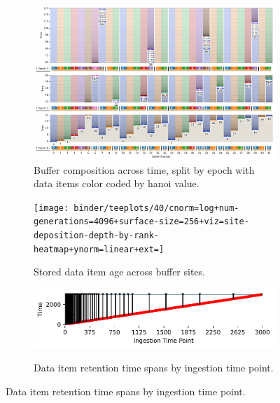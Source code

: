 \begin{figure}[h!]
  \centering

\begin{subfigure}[b]{\linewidth}
\includegraphics[width=\linewidth]{
binder/teeplots/40/num-generations=128+surface-size=32+viz=site-reservation-by-rank-spliced-at-heatmap+ext=}
\caption{
  Buffer composition across time, split by epoch with data items color coded by hanoi value.
}
\end{subfigure}

 \begin{minipage}[]{\textwidth}
 \vspace{-2pt}
  \begin{subfigure}[t]{0.7\linewidth}
    \vspace{0pt}
    \centering
  \texttt{[image: binder/teeplots/40/cnorm=log+num-generations=4096+surface-size=256+viz=site-deposition-depth-by-rank-heatmap+ynorm=linear+ext=]}
  \end{subfigure}%
  \begin{subfigure}[t]{0.3\linewidth}
  \vspace{-2pt}
  \caption{%
    Stored data item age across buffer sites.
  }
\end{subfigure}
\end{minipage}

   \begin{minipage}[]{\textwidth}
   \vspace{-2pt}
  \begin{subfigure}[t]{0.7\linewidth}
  \vspace{0pt}
    \centering
    \includegraphics[width=0.88\linewidth,clip]{binder/teeplots/40/num-generations=4096+surface-size=64+viz=stratum-persistence-dripplot+ext=}
  \end{subfigure}%
  \begin{subfigure}[t]{0.3\linewidth}
  \vspace{-2pt}
  \caption{%
    Data item retention time spans by ingestion time point.
  }
  \end{subfigure}
  \end{minipage}


\end{figure}
